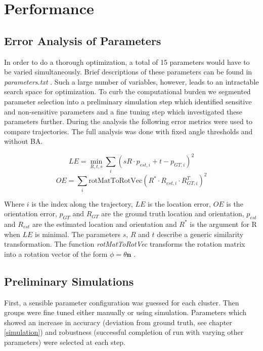 \chapter{Performance}
\label{performance}

\section{Error Analysis of Parameters}

In order to do a thorough optimization, a total of 15 parameters would have to be varied simultaneously. 
Brief descriptions of these parameters can be found in \emph{parameters.txt} .
Such a large number of variables, however, leads to an intractable search space for optimization. 
To curb the computational burden we segmented parameter selection into a preliminary simulation step  which identified sensitive and non-sensitive parameters and a fine tuning step which investigated these parameters further. 
During the analysis the following error metrics were used to compare trajectories. The full analysis was done with fixed angle thresholds and without BA.

\begin{equation*}LE = \underset{R,t,s}{\min} \sum_i (s R \cdot p_{est, i} + t - p_{GT, i})^2\end{equation*}
\begin{equation*}OE = \sum_i \text{rotMatToRotVec}(R^* \cdot R_{est,i} \cdot R_{GT, i}^T)^2\end{equation*}

Where $i$ is the index along the trajectory, $LE$ is the location error, $OE$ is the orientation error, $p_{GT}$ and $R_{GT}$ are the ground truth location and orientation, $p_{est}$ and $R_{est}$ are the estimated location and orientation and $R^*$ is the argument for R when $LE$ is minimal. 
The parameters $s$, $R$ and $t$ describe a generic similarity transformation. 
The function \emph{rotMatToRotVec} transforms the rotation matrix into a rotation vector of the form $\phi = \theta \textbf{n}$ .

\section{Preliminary Simulations}

First, a sensible parameter configuration was guessed for each cluster. 
Then groups were fine tuned either manually or using simulation.  
Parameters which showed an increase in accuracy (deviation from ground truth, see chapter \ref{simulation}) and robustness (successful completion of run with varying other parameters) were selected at each step.

